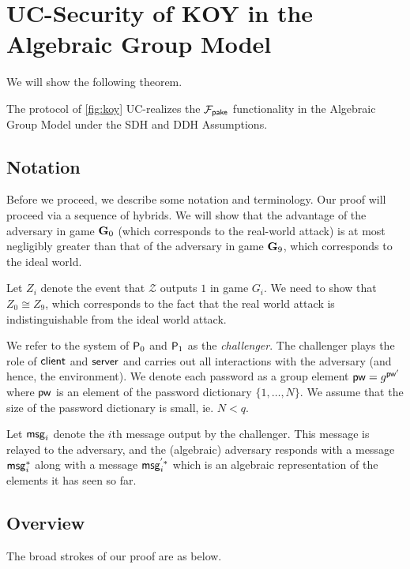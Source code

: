 \section{UC-Security of KOY in the Algebraic Group Model}

We will show the following theorem.

\begin{theorem}
	\label{thm:agm}
	The protocol of \cref{fig:koy} UC-realizes the $\mathcal{F}_{\mathsf{pake}}$ functionality in the Algebraic Group Model under the SDH and DDH Assumptions.
\end{theorem}

\subsection{Notation}

Before we proceed, we describe some notation and terminology. Our proof will proceed via a sequence of hybrids. We will show that the advantage of the adversary in game $\mathbf{G}_0$ (which corresponds to the real-world attack) is at most negligibly greater than that of the adversary in game $\mathbf{G}_9$, which corresponds to the ideal world.

Let $Z_i$ denote the event that $\mathcal{Z}$ outputs $1$ in game $G_i$. We need to show that $Z_0\cong Z_9$, which corresponds to the fact that the real world attack is indistinguishable from the ideal world attack.

We refer to the system of $\mathsf{P}_0$ and $\mathsf{P}_1$ as the \textit{challenger}. The challenger plays the role of $\mathsf{client}$ and $\mathsf{server}$ and carries out all interactions with the adversary (and hence, the environment). We denote each password as a group element $\mathsf{pw} = g^{\mathsf{pw}'}$ where $\mathsf{pw}$ is an element of the password dictionary $\{1,\dots,N\}$. We assume that the size of the password dictionary is small, ie. $N<q$.

Let $\mathsf{msg}_{i}$ denote the $i$th message output by the challenger. This message is relayed to the adversary, and the (algebraic) adversary responds with a message $\mathsf{msg}_{i}^{*}$ along with a message $\mathsf{msg}_{i}^{'*}$ which is an algebraic representation of the elements it has seen so far. 


\subsection{Overview}

The broad strokes of our proof are as below.


